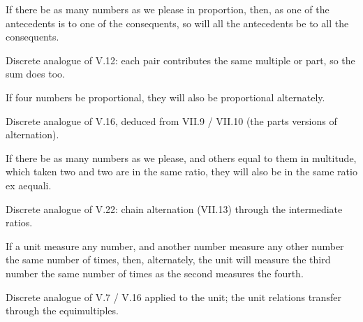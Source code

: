 \begin{claim}
\label{prop:VII.12}
If there be as many numbers as we please in proportion, then, as one
of the antecedents is to one of the consequents, so will all the
antecedents be to all the consequents.
\end{claim}
\begin{evidence}
\label{ev:VII.12}
Discrete analogue of V.12: each pair contributes the same multiple
or part, so the sum does too.
\end{evidence}

\begin{claim}
\label{prop:VII.13}
If four numbers be proportional, they will also be proportional
alternately.
\end{claim}
\begin{evidence}
\label{ev:VII.13}
Discrete analogue of V.16, deduced from VII.9 / VII.10 (the parts
versions of alternation).
\end{evidence}

\begin{claim}
\label{prop:VII.14}
If there be as many numbers as we please, and others equal to them
in multitude, which taken two and two are in the same ratio, they
will also be in the same ratio ex aequali.
\end{claim}
\begin{evidence}
\label{ev:VII.14}
Discrete analogue of V.22: chain alternation (VII.13) through the
intermediate ratios.
\end{evidence}

\begin{claim}
\label{prop:VII.15}
If a unit measure any number, and another number measure any other
number the same number of times, then, alternately, the unit will
measure the third number the same number of times as the second
measures the fourth.
\end{claim}
\begin{evidence}
\label{ev:VII.15}
Discrete analogue of V.7 / V.16 applied to the unit; the unit
relations transfer through the equimultiples.
\end{evidence}

